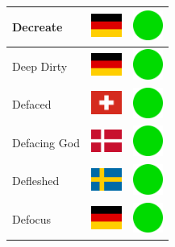 \documentclass[12pt, a4paper, twoside]{report}
\begin{document}
\begin{center}
\begin{longtable}{|p{5cm}|p{2cm}|p{2cm}|}
Decreate & \includegraphics[width=1cm]{4x3/de} & \includegraphics[width=1cm]{likes/y} \\ \hline
Deep Dirty & \includegraphics[width=1cm]{4x3/de} & \includegraphics[width=1cm]{likes/y} \\ \hline
Defaced & \includegraphics[width=1cm]{4x3/ch} & \includegraphics[width=1cm]{likes/y} \\ \hline
Defacing God & \includegraphics[width=1cm]{4x3/dk} & \includegraphics[width=1cm]{likes/y} \\ \hline
Defleshed & \includegraphics[width=1cm]{4x3/se} & \includegraphics[width=1cm]{likes/y} \\ \hline
Defocus & \includegraphics[width=1cm]{4x3/de} & \includegraphics[width=1cm]{likes/y} \\ \hline

\end{longtable}
\end{center}
\end{document}
